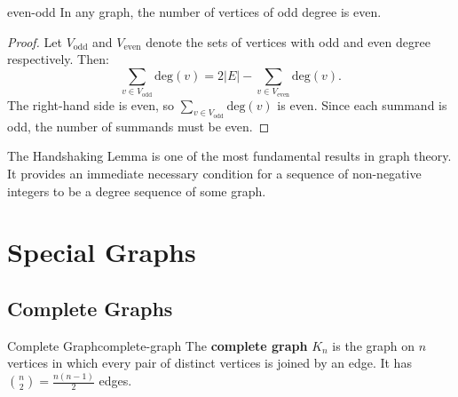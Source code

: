 \documentclass[11pt,a4paper]{scrartcl}
\renewcommand{\deg}{\mathrm{deg}}        %
\begin{document}
\begin{corollary}{}{even-odd}
In any graph, the number of vertices of odd degree is even.
\end{corollary}

\begin{proof}
Let $V_{\text{odd}}$ and $V_{\text{even}}$ denote the sets of vertices with odd and even degree respectively. Then:
\[
  \sum_{v \in V_{\text{odd}}} \deg(v) = 2|E| - \sum_{v \in V_{\text{even}}} \deg(v).
\]
The right-hand side is even, so $\sum_{v \in V_{\text{odd}}} \deg(v)$ is even. Since each summand is odd, the number of summands must be even.
\end{proof}

\begin{remark}
The Handshaking Lemma is one of the most fundamental results in graph theory. It provides an immediate necessary condition for a sequence of non-negative integers to be a degree sequence of some graph.
\end{remark}


\section{Special Graphs}

\subsection{Complete Graphs}

\begin{definition}{Complete Graph}{complete-graph}
The \textbf{complete graph} $K_n$ is the graph on $n$ vertices in which every pair of distinct vertices is joined by an edge. It has $\binom{n}{2} = \frac{n(n-1)}{2}$ edges.
\end{definition}
\end{document}
